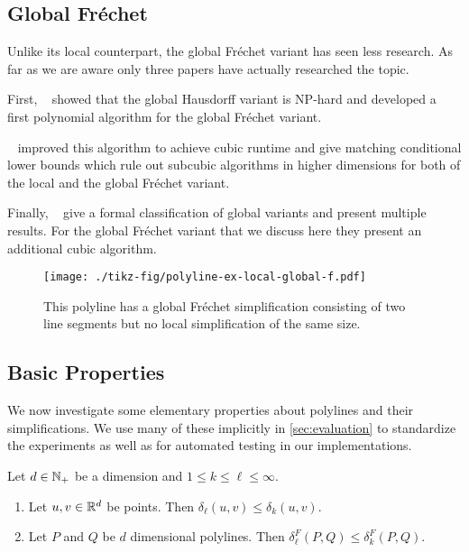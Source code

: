 \subsection{Global Fréchet}
Unlike its local counterpart, the global Fréchet variant has seen less research. As far as we are aware only three papers have actually researched the topic.

First, \citeauthor{on_optimal_polyline_simplification_using_the_hausdorff_and_frechet_distance}~\cite{on_optimal_polyline_simplification_using_the_hausdorff_and_frechet_distance} showed that the global Hausdorff variant is NP-hard and developed a first polynomial algorithm for the global Fréchet variant.

\citeauthor{polyline_simplification_has_cubic_complexity_bringmannetal}~\cite{polyline_simplification_has_cubic_complexity_bringmannetal} improved this algorithm to achieve cubic runtime and give matching conditional lower bounds which rule out subcubic algorithms in higher dimensions for both of the local and the global Fréchet variant. 

Finally, \citeauthor{global_curve_simplification}~\cite{global_curve_simplification} give a formal classification of global variants and present multiple results. For the global Fréchet variant that we discuss here they present an additional cubic algorithm.

\begin{figure}[b]
  \centering
  \texttt{[image: ./tikz-fig/polyline-ex-local-global-f.pdf]}
  \caption{This polyline has a global Fréchet simplification consisting of two line segments but no local simplification of the same size.}
  \label{fig:polyline-ex-local-global-f}
\end{figure}

\subsection{Basic Properties}
We now investigate some elementary properties about polylines and their simplifications. We use many of these implicitly in \cref{sec:evaluation} to standardize the experiments as well as for automated testing in our implementations.

\begin{lemma}\label{lem:monotonicity_minkowski}
  Let \(d \in \mathbb{N}_+\) be a dimension and \(1 \leq k \leq \ell \leq \infty\).
	\begin{enumerate}
		\item Let \(u, v \in \mathbb{R}^d\) be points. Then \(\delta_\ell(u,v) \leq \delta_k(u, v)\).
		\item Let \(P\) and \(Q\) be \(d\) dimensional polylines. Then \(\delta_\ell^F(P, Q) \leq \delta_k^F(P, Q)\).
	\end{enumerate}
\end{lemma}

